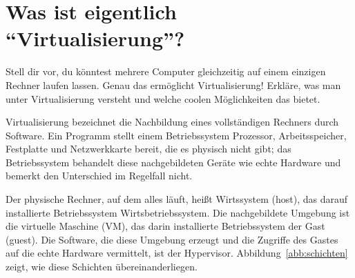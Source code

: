 \chapter{Was ist eigentlich \enquote{Virtualisierung}?}
\label{kap:grundlagen}

\begin{aufgabe}
Stell dir vor, du könntest mehrere Computer gleichzeitig auf einem einzigen Rechner laufen lassen. Genau das ermöglicht Virtualisierung! Erkläre, was man unter Virtualisierung versteht und welche coolen Möglichkeiten das bietet.
\end{aufgabe}
\label{sec:virtualisierung}

Virtualisierung bezeichnet die Nachbildung eines vollständigen Rechners durch Software. Ein Programm stellt einem Betriebssystem Prozessor, Arbeitsspeicher, Festplatte und Netzwerkkarte bereit, die es physisch nicht gibt; das Betriebssystem behandelt diese nachgebildeten Geräte wie echte Hardware und bemerkt den Unterschied im Regelfall nicht.

Der physische Rechner, auf dem alles läuft, heißt Wirtssystem (host), das darauf installierte Betriebssystem Wirtsbetriebssystem. Die nachgebildete Umgebung ist die virtuelle Maschine (VM), das darin installierte Betriebssystem der Gast (guest). Die Software, die diese Umgebung erzeugt und die Zugriffe des Gastes auf die echte Hardware vermittelt, ist der Hypervisor. Abbildung~\ref{abb:schichten} zeigt, wie diese Schichten übereinanderliegen.

